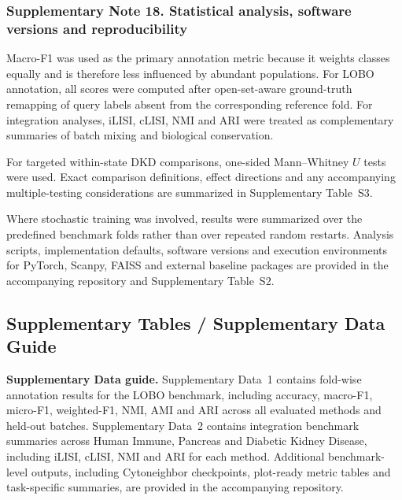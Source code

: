 \documentclass[11pt]{article}
\begin{document}
\subsubsection*{Supplementary Note 18. Statistical analysis, software versions and reproducibility}

Macro-F1 was used as the primary annotation metric because it weights classes equally and is therefore less influenced by abundant populations. For LOBO annotation, all scores were computed after open-set-aware ground-truth remapping of query labels absent from the corresponding reference fold. For integration analyses, iLISI, cLISI, NMI and ARI were treated as complementary summaries of batch mixing and biological conservation.

For targeted within-state DKD comparisons, one-sided Mann--Whitney $U$ tests were used. Exact comparison definitions, effect directions and any accompanying multiple-testing considerations are summarized in Supplementary Table~S3.

Where stochastic training was involved, results were summarized over the predefined benchmark folds rather than over repeated random restarts. Analysis scripts, implementation defaults, software versions and execution environments for PyTorch, Scanpy, FAISS and external baseline packages are provided in the accompanying repository and Supplementary Table~S2.

\subsection*{Supplementary Tables / Supplementary Data Guide}

\noindent\textbf{Supplementary Data guide.} Supplementary Data~1 contains fold-wise annotation results for the LOBO benchmark, including accuracy, macro-F1, micro-F1, weighted-F1, NMI, AMI and ARI across all evaluated methods and held-out batches. Supplementary Data~2 contains integration benchmark summaries across Human Immune, Pancreas and Diabetic Kidney Disease, including iLISI, cLISI, NMI and ARI for each method. Additional benchmark-level outputs, including Cytoneighbor checkpoints, plot-ready metric tables and task-specific summaries, are provided in the accompanying repository.
\end{document}
